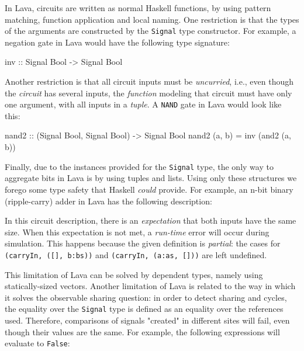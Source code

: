             In Lava, circuits are written as normal Haskell functions, by using pattern matching,
            function application and local naming.
            One restriction is that the types of the arguments are
            constructed by the \texttt{Signal} type constructor.
            For example, a negation gate in Lava would have the following type signature:

            \begin{haskellcode}
        inv :: Signal Bool -> Signal Bool
            \end{haskellcode}

            Another restriction is that all circuit inputs must be \emph{uncurried}, i.e.,
            even though the \emph{circuit} has several inputs, the \emph{function} modeling that circuit
            must have only one argument, with all inputs in a \emph{tuple}.
            A \texttt{NAND} gate in Lava would look like this:

            \begin{haskellcode}
        nand2 :: (Signal Bool, Signal Bool) -> Signal Bool
        nand2 (a, b) = inv (and2 (a, b))
            \end{haskellcode}

            Finally, due to the instances provided for the \texttt{Signal} type, the only way to
            aggregate bits in Lava is by using tuples and lists.
            Using only these structures we forego some type safety that Haskell \emph{could} provide.
            For example, an n-bit binary (ripple-carry) adder in Lava has the following description:

            \begin{center}
            \end{center}

            In this circuit description, there is an \emph{expectation} that both inputs have the same size.
            When this expectation is not met, a \emph{run-time} error will occur during simulation.
            This happens because the given definition is \emph{partial}: the cases for
            \texttt{(carryIn, ([], b:bs))} and \texttt{(carryIn, (a:as, []))} are left undefined.

            This limitation of Lava can be solved by dependent types, namely using statically-sized vectors.
            Another limitation of Lava is related to the way in which it solves the observable sharing question:
            in order to detect sharing and cycles, the equality over the \texttt{Signal} type is defined
            as an equality over the references used.
            Therefore, comparisons of signals "created" in different sites will fail,
            even though their values are the same.
            For example, the following expressions will evaluate to \texttt{False}:


